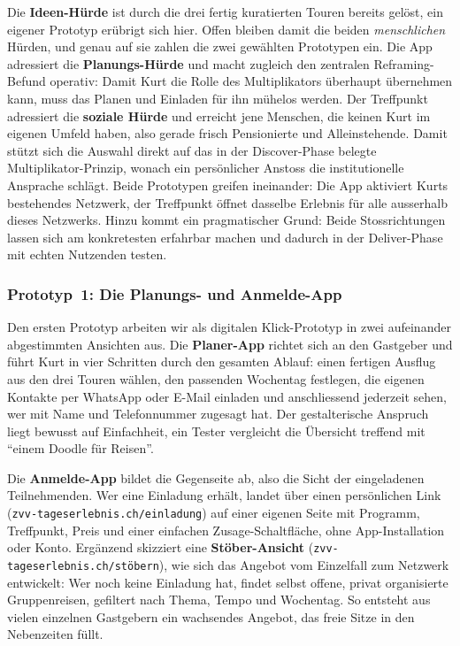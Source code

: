 Die \textbf{Ideen-Hürde} ist durch die drei fertig kuratierten Touren bereits gelöst, ein eigener Prototyp erübrigt sich hier. Offen bleiben damit die beiden \emph{menschlichen} Hürden, und genau auf sie zahlen die zwei gewählten Prototypen ein. Die App adressiert die \textbf{Planungs-Hürde} und macht zugleich den zentralen Reframing-Befund operativ: Damit Kurt die Rolle des Multiplikators überhaupt übernehmen kann, muss das Planen und Einladen für ihn mühelos werden. Der Treffpunkt adressiert die \textbf{soziale Hürde} und erreicht jene Menschen, die keinen Kurt im eigenen Umfeld haben, also gerade frisch Pensionierte und Alleinstehende. Damit stützt sich die Auswahl direkt auf das in der Discover-Phase belegte Multiplikator-Prinzip, wonach ein persönlicher Anstoss die institutionelle Ansprache schlägt. Beide Prototypen greifen ineinander: Die App aktiviert Kurts bestehendes Netzwerk, der Treffpunkt öffnet dasselbe Erlebnis für alle ausserhalb dieses Netzwerks. Hinzu kommt ein pragmatischer Grund: Beide Stossrichtungen lassen sich am konkretesten erfahrbar machen und dadurch in der Deliver-Phase mit echten Nutzenden testen.

\subsubsection{Prototyp~1: Die Planungs- und Anmelde-App}
Den ersten Prototyp arbeiten wir als digitalen Klick-Prototyp in zwei aufeinander abgestimmten Ansichten aus. Die \textbf{Planer-App} richtet sich an den Gastgeber und führt Kurt in vier Schritten durch den gesamten Ablauf: einen fertigen Ausflug aus den drei Touren wählen, den passenden Wochentag festlegen, die eigenen Kontakte per WhatsApp oder E-Mail einladen und anschliessend jederzeit sehen, wer mit Name und Telefonnummer zugesagt hat. Der gestalterische Anspruch liegt bewusst auf Einfachheit, ein Tester vergleicht die Übersicht treffend mit \enquote{einem Doodle für Reisen}.

Die \textbf{Anmelde-App} bildet die Gegenseite ab, also die Sicht der eingeladenen Teilnehmenden. Wer eine Einladung erhält, landet über einen persönlichen Link (\texttt{zvv-tageserlebnis.ch/einladung}) auf einer eigenen Seite mit Programm, Treffpunkt, Preis und einer einfachen Zusage-Schaltfläche, ohne App-Installation oder Konto. Ergänzend skizziert eine \textbf{Stöber-Ansicht} (\texttt{zvv-tageserlebnis.ch/stöbern}), wie sich das Angebot vom Einzelfall zum Netzwerk entwickelt: Wer noch keine Einladung hat, findet selbst offene, privat organisierte Gruppenreisen, gefiltert nach Thema, Tempo und Wochentag. So entsteht aus vielen einzelnen Gastgebern ein wachsendes Angebot, das freie Sitze in den Nebenzeiten füllt.

